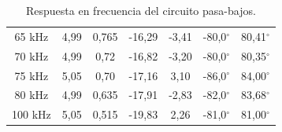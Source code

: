 \documentclass{article}
\begin{document}
\begin{table}[H]
\begin{tabular}{ccccccc}
                    65 kHz & 4,99 & 0,765 & -16,29 & -3,41 & -80,0$^\circ$ & 80,41$^\circ$ \\
                    70 kHz & 4,99 & 0,72 & -16,82 & -3,20 & -80,0$^\circ$ & 80,35$^\circ$ \\
                    75 kHz & 5,05 & 0,70 & -17,16 & 3,10 & -86,0$^\circ$ & 84,00$^\circ$ \\
                    80 kHz & 4,99 & 0,635 & -17,91 & -2,83 & -82,0$^\circ$ & 83,68$^\circ$ \\
                    100 kHz & 5,05 & 0,515 & -19,83 & 2,26 & -81,0$^\circ$ & 81,00$^\circ$ \\
                    \bottomrule
                    \end{tabular}
                    \vspace{0.3cm}
                    \caption{Respuesta en frecuencia del circuito pasa-bajos.}
                    \label{tab:pasa_bajos_freq}
                    \end{table}
  
\end{document}
